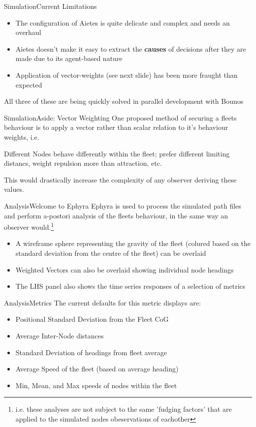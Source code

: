 \documentclass[10pt]{beamer}
\begin{document}
\begin{frame}{Simulation}{Current Limitations}
  \begin{itemize}
    \item The configuration of Aietes is quite delicate and complex and needs an overhaul
    \item Aietes doesn't make it easy to extract the {\bf causes} of decisions after they are made due to its agent-based nature
    \item Application of vector-weights (see next slide) has been more fraught than expected
  \end{itemize}
  All three of these are being quickly solved in parallel development with Bounos
\end{frame}

\begin{frame}{Simulation}{Aside: Vector Weighting}
  One proposed method of securing a fleets behaviour is to apply a vector rather than scalar relation to it's behaviour weights, i.e.

  Different Nodes behave differently within the fleet; prefer different limiting distancs, weight repulsion more than attraction, etc.
  
  This would drastically increase the complexity of any observer deriving these values.
\end{frame}

\begin{frame}{Analysis}{Welcome to Ephyra}
  Ephyra is used to process the simulated path files and perform a-postori analysis of the fleets behaviour, in the same way an observer would.\footnote{i.e. these analyses are not subject to the same 'fudging factors' that are applied to the simulated nodes obeservations of eachother}
  \begin{itemize}
    \item A wireframe sphere representing the gravity of the fleet (colured based on the standard deviation from the centre of the fleet) can be overlaid
    \item Weighted Vectors can also be overlaid showing individual node headings
    \item The LHS panel also shows the time series responses of a selection of metrics
  \end{itemize}
\end{frame}

\begin{frame}{Analysis}{Metrics}
  The current defaults for this metric displays are:
  \begin{itemize}
    \item Positional Standard Deviation from the Fleet CoG
    \item Average Inter-Node distances
    \item Standard Deviation of headings from fleet average
    \item Average Speed of the fleet (based on average heading)
    \item Min, Mean, and Max speeds of nodes within the fleet
  \end{itemize}
\end{frame}
\end{document}
